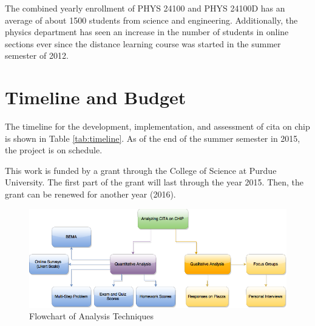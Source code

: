 The combined yearly enrollment of PHYS 24100 and PHYS 24100D has an average of about 1500 students from science and engineering. Additionally, the physics department has seen an increase in the number of students in online sections ever since the distance learning course was started in the summer semester of 2012.

\section{Timeline and Budget}

The timeline for the development, implementation, and assessment of \gls{cita} on \gls{chip} is shown in Table \ref{tab:timeline}. As of the end of the summer semester in 2015, the project is on schedule.

This work is funded by a grant through the College of Science at Purdue University. The first part of the grant will last through the year 2015. Then, the grant can be renewed for another year (2016).

\pagebreak

\begin{figure}[h]
	\centering
	\includegraphics[width=6in]{img/chapter3/analysis_flowchart}
	\caption{Flowchart of Analysis Techniques}
  \label{fig:analysisFlowchart}
\end{figure}

\pagebreak

